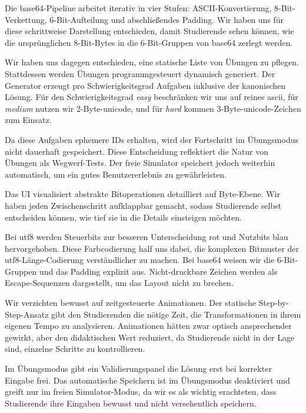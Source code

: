 Die \gls{base64}-Pipeline arbeitet iterativ in vier Stufen: ASCII-Konvertierung, 8-Bit-Verkettung, 6-Bit-Aufteilung und abschließendes Padding. Wir haben uns für diese schrittweise Darstellung entschieden, damit Studierende sehen können, wie die ursprünglichen 8-Bit-Bytes in die 6-Bit-Gruppen von \gls{base64} zerlegt werden.


Wir haben uns dagegen entschieden, eine statische Liste von Übungen zu pflegen. Stattdessen werden Übungen programmgesteuert dynamisch generiert. Der Generator erzeugt pro Schwierigkeitsgrad Aufgaben inklusive der kanonischen Lösung. Für den Schwierigkeitsgrad \textit{easy} beschränken wir uns auf reines \gls{ascii}, für \textit{medium} nutzen wir 2-Byte-\gls{unicode}, und für \textit{hard} kommen 3-Byte-\gls{unicode}-Zeichen zum Einsatz.

Da diese Aufgaben ephemere IDs erhalten, wird der Fortschritt im Übungsmodus nicht dauerhaft gespeichert. Diese Entscheidung reflektiert die Natur von Übungen als Wegwerf-Tests. Der freie Simulator speichert jedoch weiterhin automatisch, um ein gutes Benutzererlebnis zu gewährleisten.


Das UI visualisiert abstrakte Bitoperationen detailliert auf Byte-Ebene. Wir haben jeden Zwischenschritt aufklappbar gemacht, sodass Studierende selbst entscheiden können, wie tief sie in die Details einsteigen möchten.

Bei \gls{utf8} werden Steuerbits zur besseren Unterscheidung rot und Nutzbits blau hervorgehoben. Diese Farbcodierung half uns dabei, die komplexen Bitmuster der \gls{utf8}-Länge-Codierung verständlicher zu machen. Bei \gls{base64} weisen wir die 6-Bit-Gruppen und das Padding explizit aus. Nicht-druckbare Zeichen werden als Escape-Sequenzen dargestellt, um das Layout nicht zu brechen.

Wir verzichten bewusst auf zeitgesteuerte Animationen. Der statische Step-by-Step-Ansatz gibt den Studierenden die nötige Zeit, die Transformationen in ihrem eigenen Tempo zu analysieren. Animationen hätten zwar optisch ansprechender gewirkt, aber den didaktischen Wert reduziert, da Studierende nicht in der Lage sind, einzelne Schritte zu kontrollieren.

Im Übungsmodus gibt ein Validierungspanel die Lösung erst bei korrekter Eingabe frei. Das automatische Speichern ist im Übungsmodus deaktiviert und greift nur im freien Simulator-Modus, da wir es als wichtig erachteten, dass Studierende ihre Eingaben bewusst und nicht versehentlich speichern.


